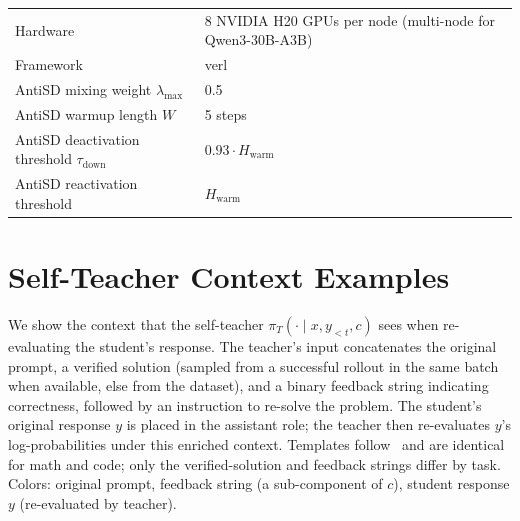 \documentclass{article}
\begin{document}
\begin{table}[h]
\begin{tabular}{ll}
    Hardware                                             & 8 NVIDIA H20 GPUs per node (multi-node for Qwen3-30B-A3B) \\
    Framework                                            & verl~\citep{sheng2025hybridflow}                          \\
    \midrule
    AntiSD mixing weight $\lambda_{\max}$                & 0.5                                                       \\
    AntiSD warmup length $W$                             & 5 steps                                                   \\
    AntiSD deactivation threshold $\tau_{\mathrm{down}}$ & $0.93 \cdot H_{\mathrm{warm}}$                            \\
    AntiSD reactivation threshold                        & $H_{\mathrm{warm}}$                                       \\
    \bottomrule
  \end{tabular}
\end{table}

\section{Self-Teacher Context Examples}
\label{app:prompts}


We show the context that the self-teacher $\pi_T(\cdot \mid x, y_{<t}, c)$ sees when re-evaluating the student's response. The teacher's input concatenates the original prompt, a verified solution (sampled from a successful rollout in the same batch when available, else from the dataset), and a binary feedback string indicating correctness, followed by an instruction to re-solve the problem. The student's original response $y$ is placed in the assistant role; the teacher then re-evaluates $y$'s log-probabilities under this enriched context. Templates follow~\citep{sdpo,opsd} and are identical for math and code; only the verified-solution and feedback strings differ by task. Colors: {\color{sysblue}original prompt}, {\color{fbredcolor}feedback string} (a sub-component of $c$), {\color{respgreen}student response $y$ (re-evaluated by teacher)}.
\end{document}
